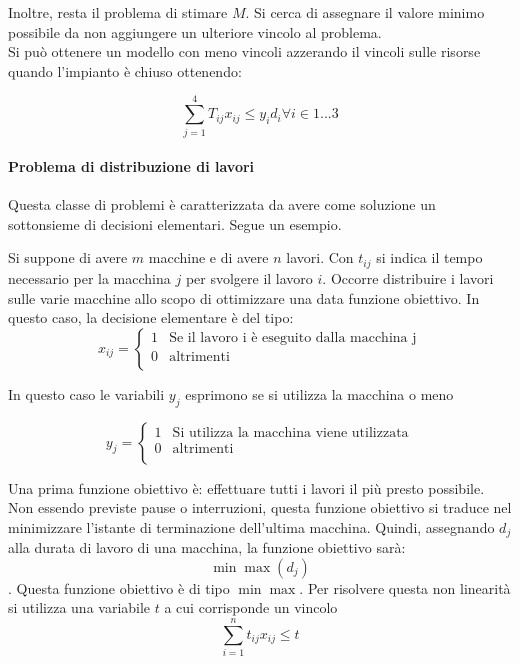 \documentclass{article}
\begin{document}
Inoltre, resta il problema di stimare $M$. Si cerca di assegnare il valore 
minimo possibile da non aggiungere un ulteriore vincolo al problema.\\

Si può ottenere un modello con meno vincoli azzerando il vincoli sulle 
risorse quando l'impianto è chiuso ottenendo:

$$  \sum_{j=1}^{4} T_{ij}x_{ij} \leq y_id_i \forall i \in {1...3}$$

\paragraph{Problema di distribuzione di lavori}
Questa classe di problemi è caratterizzata da avere come soluzione un 
sottonsieme di decisioni elementari. Segue un esempio.

Si suppone di avere $m$ macchine e di avere $n$ lavori. Con $t_{ij}$ si indica 
il tempo necessario per la macchina $j$ per svolgere il lavoro $i$. Occorre 
distribuire i lavori sulle varie macchine allo scopo di ottimizzare una data 
funzione obiettivo. In questo caso, la decisione elementare è del tipo: 
\begin{equation*}
  x_{ij} = 
  \begin{cases}
    1 & \text{Se il lavoro i è eseguito dalla macchina j} \\
    0 & \text{altrimenti}\\
  \end{cases}
\end{equation*}

In questo caso le variabili $y_j$ esprimono se si utilizza la macchina o meno

\begin{equation*}
  y_{j} = 
  \begin{cases}
    1 & \text{Si utilizza la macchina viene utilizzata}\\
    0 & \text{altrimenti}\\
  \end{cases}
\end{equation*}

Una prima funzione obiettivo è: effettuare tutti i lavori il più presto 
possibile. Non essendo previste pause o interruzioni, questa funzione obiettivo 
si traduce nel minimizzare l'istante di terminazione dell'ultima macchina. 
Quindi, assegnando $d_j$ alla durata di lavoro di una macchina, la funzione 
obiettivo sarà: $$\min \max (d_j)$$. Questa funzione obiettivo è di tipo $\min 
\max$. Per risolvere questa non linearità si utilizza una variabile $t$ a 
cui corrisponde un vincolo $$\sum_{i=1}^n t_{ij}x_{ij} \leq t$$
\end{document}
